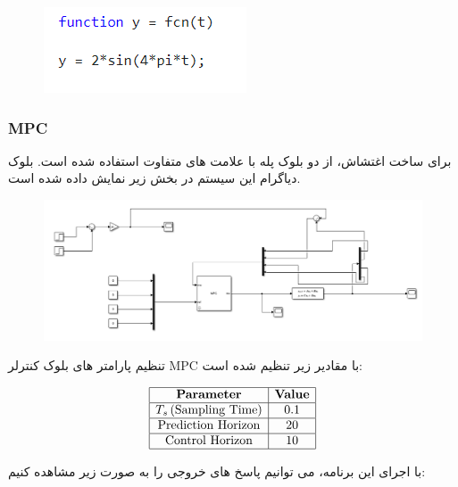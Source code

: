  \begin{figure}
 	\centering
 	\includegraphics[width=1\linewidth]{../img/Q3_Disturbance}
 	\caption{}
 	\label{fig:q3disturbance}
 \end{figure}
 
 \subsubsection{MPC}
 برای ساخت اغتشاش، از دو بلوک پله با علامت های متفاوت استفاده شده است. بلوک دیاگرام این سیستم در بخش زیر نمایش داده شده است.
 
\begin{figure}[H]
	\centering
	\includegraphics[width=1\linewidth]{../img/Q3_MPC_Block}
	\caption{}
	\label{fig:q3mpcblock}
\end{figure}
 
 تنظیم پارامتر های بلوک کنترلر MPC با مقادیر زیر تنظیم شده است:
 
 \[
 \begin{array}{|c|c|}
 	\hline
 	\textbf{Parameter} & \textbf{Value} \\ 
 	\hline
 	T_s \, (\text{Sampling Time}) & 0.1 \\ 
 	\hline
 	\text{Prediction Horizon} & 20 \\ 
 	\hline
 	\text{Control Horizon} & 10 \\ 
 	\hline
 \end{array}
 \]
 
 با اجرای این برنامه، می توانیم پاسخ های خروجی را به صورت زیر مشاهده کنیم:
 
